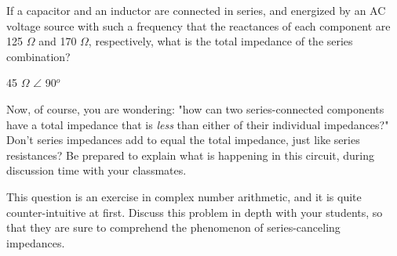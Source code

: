 

If a capacitor and an inductor are connected in series, and energized by an AC voltage source with such a frequency that the reactances of each component are 125 $\Omega$ and 170 $\Omega$, respectively, what is the total impedance of the series combination?







45 $\Omega$ $\angle$ 90$^{o}$

\vskip 10pt

Now, of course, you are wondering: "how can two series-connected components have a total impedance that is {\it less} than either of their individual impedances?"  Don't series impedances add to equal the total impedance, just like series resistances?  Be prepared to explain what is happening in this circuit, during discussion time with your classmates.







This question is an exercise in complex number arithmetic, and it is quite counter-intuitive at first.  Discuss this problem in depth with your students, so that they are sure to comprehend the phenomenon of series-canceling impedances.




